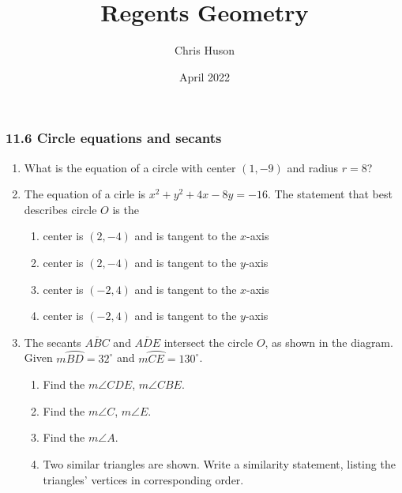 \documentclass[12pt, oneside]{article}
\title{Regents Geometry}
\author{Chris Huson}
\date{April 2022}
\begin{document}
\subsubsection*{11.6 Circle equations and secants}
\begin{enumerate}[itemsep=2cm]
\item What is the equation of a circle with center $(1,-9)$ and radius $r=8$?
  
\item %
  The equation of a cirle is $x^2+y^2+4x-8y=-16$. The statement that best describes circle $O$ is the
    \begin{enumerate}
      \item center is $(2,-4)$ and is tangent to the $x$-axis
      \item center is $(2,-4)$ and is tangent to the $y$-axis
      \item center is $(-2,4)$ and is tangent to the $x$-axis
      \item center is $(-2,4)$ and is tangent to the $y$-axis
    \end{enumerate}

\item The secants $\overline{ABC}$ and $\overline{ADE}$ intersect the circle $O$, as shown in the diagram. \\Given $m \wideparen{BD}=32^\circ$ and $m \wideparen{CE}=130^\circ$.
  \begin{enumerate}
    \item Find the $m\angle CDE$, $m\angle CBE$.
    \item Find the $m\angle C$, $m\angle E$.
    \item Find the $m\angle A$.
    \item Two similar triangles are shown. Write a similarity statement, listing the triangles' vertices in corresponding order.
  \end{enumerate}
  \begin{center}
  \end{center}
    

\end{enumerate}
\end{document}
